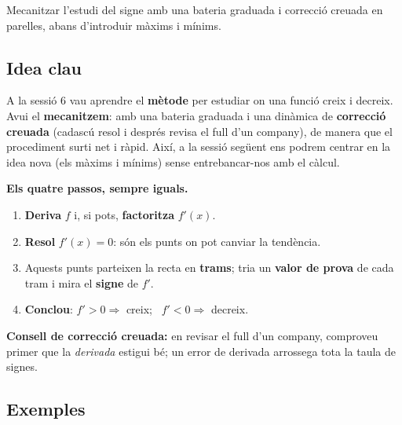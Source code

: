 %
{Mecanitzar l'estudi del signe amb una bateria graduada i correcció creuada en parelles, abans d'introduir màxims i mínims.}

\subsection{Idea clau}

A la sessió 6 vau aprendre el \textbf{mètode} per estudiar on una funció creix i
decreix. Avui el \textbf{mecanitzem}: amb una bateria graduada i una dinàmica de
\textbf{correcció creuada} (cadascú resol i després revisa el full d'un company), de
manera que el procediment surti net i ràpid. Així, a la sessió següent ens podrem
centrar en la idea nova (els màxims i mínims) sense entrebancar-nos amb el càlcul.

\begin{idea}
\textbf{Els quatre passos, sempre iguals.}
\begin{enumerate}[leftmargin=1.6em, itemsep=2pt]
  \item \textbf{Deriva} $f$ i, si pots, \textbf{factoritza} $f'(x)$.
  \item \textbf{Resol} $f'(x)=0$: són els punts on pot canviar la tendència.
  \item Aquests punts parteixen la recta en \textbf{trams}; tria un \textbf{valor de
        prova} de cada tram i mira el \textbf{signe} de $f'$.
  \item \textbf{Conclou}: $f'>0\Rightarrow$ creix; \ $f'<0\Rightarrow$ decreix.
\end{enumerate}
\textbf{Consell de correcció creuada:} en revisar el full d'un company, comproveu
primer que la \emph{derivada} estigui bé; un error de derivada arrossega tota la taula
de signes.
\end{idea}

\subsection{Exemples}

